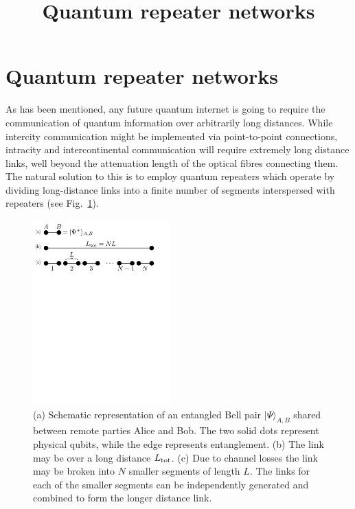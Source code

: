 \documentclass[twocolumn, aps, rmp, amsmath, amssymb, nofootinbib, superscriptaddress, longbibliography, floatfix, table-of-contents, eqsecnum]{revtex4-1}
\begin{document}
\title{Quantum repeater networks}

\maketitle

\section{Quantum repeater networks}

\tableofcontents 

As has been mentioned, any future quantum internet is going to require the communication of quantum information over arbitrarily long distances. While intercity communication might be implemented via point-to-point connections, intracity and intercontinental communication will require extremely long distance links, well beyond the attenuation length of the optical fibres connecting them. The natural solution to this is to employ quantum repeaters \cite{bib:Gisin2007, bib:SSRG09, bib:WJM2015} which operate by dividing long-distance links into a finite number of segments interspersed with repeaters (see Fig.~\ref{fig:repeaters_1}). 
\begin{figure}[!htb]
\includegraphics[width=0.475\textwidth]{repeaters_1}
\caption{(a) Schematic representation of an entangled Bell pair $| \Psi\rangle_{A,B}$ shared between remote parties Alice and Bob. The two solid dots represent physical qubits, while the edge represents entanglement. (b) The link may be over a long distance $L_{\rm tot}$. (c) Due to channel losses the link may be broken into $N$ smaller segments of length $L$. The links for each of the smaller segments can be independently generated and combined to form the longer distance link.} 
\label{fig:repeaters_1}
\end{figure} 
\end{document}
